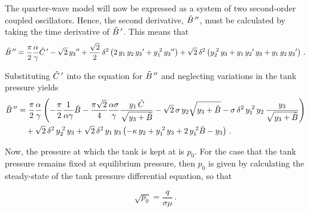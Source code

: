 The quarter-wave model will now be expressed as a system of two second-order coupled oscillators. Hence, the second derivative, $\tilde{B}\,{''}$, must be calculated by taking the time derivative of $\tilde{B}\,{'}$. This means that
~
\begin{equation*}
    \tilde{B}\,{''} = \frac{\pi}{2} \frac{\alpha}{\gamma} \tilde{C}\,{'} - \sqrt{2} \, y_3{''} + \frac{\sqrt{2}}{2} \, \delta^2 \left( 2 \, y_1 \, y_2 \, y_3{'} + y_1^{\;2} \, y_3{''} \right) + \sqrt{2} \, \delta^2 \left( y_2^{\;2} \, y_3 + y_1 \, y_2{'} \, y_3 + y_1 \, y_2 \, y_3{'} \right) \, .
\end{equation*}

Substituting $\tilde{C}\,{'}$ into the equation for $\tilde{B}\,{''}$ and neglecting variations in the tank pressure yields
~
\begin{equation} \label{eq: QWMOscillatorB}
\begin{split}
    \ddash{\tilde{B}\,} &= \frac{\pi}{2} \frac{\alpha}{\gamma} \left( - \frac{\pi}{2} \frac{1}{\alpha \gamma} \tilde{B} - \frac{\pi \sqrt{2}}{4} \frac{\alpha \sigma}{\gamma} \frac{y_1 \, \tilde{C}}{\sqrt{y_3 + \tilde{B}}} - \sqrt{2} \, \sigma \, y_2 \sqrt{y_3 + \tilde{B}} - \sigma \, \delta^2 \, y_1\power{2} \, y_2 \, \frac{y_3}{\sqrt{y_3 + \tilde{B}}} \right)
    \\ & \quad %
    + \sqrt{2} \, \delta^2 \, y_2\power{2} \, y_3
    + \sqrt{2} \, \delta^2 \, y_1 \, y_3 \left( - \kappa \, y_2 + y_1\power{2} \, y_3 + 2 \, y_1 \power{2} \tilde{B} - y_3 \right) \, .
\end{split}
\end{equation}

Now, the pressure at which the tank is kept at is $p_0$. For the case that the tank pressure remains fixed at equilibrium pressure, then $p_0$ is given by calculating the steady-state of the tank pressure differential equation, so that

\begin{equation*}
    \sqrt{p_0} = \frac{q}{\sigma \mu} \, .
\end{equation*}

